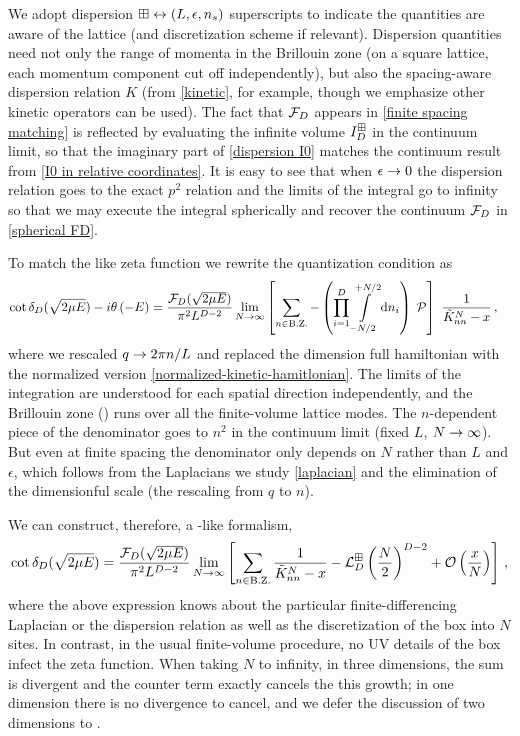 We adopt dispersion $\boxplus \leftrightarrow (L, \epsilon, {n_s})$ superscripts to indicate the quantities are aware of the lattice (and discretization scheme if relevant).
Dispersion quantities need not only the range of momenta in the Brillouin zone (on a square lattice, each momentum component cut off independently), but also the spacing-aware dispersion relation $K$ (from \eqref{kinetic}, for example, though we emphasize other kinetic operators can be used).
The fact that $\mathcal{F}_D$ appears in \eqref{finite spacing matching} is reflected by evaluating the infinite volume $I_D^{\boxplus}$ in the continuum limit, so that the imaginary part of \eqref{dispersion I0} matches the continuum result from \eqref{I0 in relative coordinates}.
It is easy to see that when $\epsilon\rightarrow0$ the dispersion relation goes to the exact $p^2$ relation and the limits of the integral go to infinity so that we may execute the integral spherically and recover the continuum $\mathcal{F}_D$ in \eqref{spherical FD}.

To match the \Luscher like zeta function we rewrite the quantization condition as
\begin{align}\label{eq:dispersion-counter-integral}
    \cot \delta_D(\sqrt{2 \mu E})-i\theta\left(-E\right)
    &=
    \frac{\mathcal{F}_D(\sqrt{2 \mu E})}{\pi^2 L^{D-2}}
    \lim_{N\rightarrow\infty}
    \left[
    	\sum_{n\in\text{B.Z.}} -
		\left(\prod_{i=1}^D
    		\int\limits_{-N/2}^{+N/2}
    		\mathrm{d} n_i
    	\right)\; \mathcal{P}
	\right]\  \frac{1}{\tilde K_{nn}^{N}-x}
	\, ,
\end{align}
where we rescaled $q\rightarrow 2\pi n/L$ and replaced the dimension full hamiltonian with the normalized version \eqref{normalized-kinetic-hamitlonian}.
The limits of the integration are understood for each spatial direction independently, and the Brillouin zone (\BZ) runs over all the finite-volume lattice modes.
The $n$-dependent piece of the denominator goes to $n^2$ in the continuum limit (fixed $L$, $N\rightarrow\infty$).
But even at finite spacing the denominator only depends on $N$ rather than $L$ and $\epsilon$, which follows from the Laplacians we study \eqref{laplacian} and the elimination of the dimensionful scale (the rescaling from $q$ to $n$).

We can construct, therefore, a \Luscher-like formalism,
\begin{align}
    \label{eq:dispersion quantization}
    \cot \delta_D( \sqrt{2 \mu E} )
    =
	\frac{\mathcal{F}_D(\sqrt{2 \mu E})}{\pi^2 L^{D-2}}
	\lim_{N\rightarrow\infty}
    \left[
    	\sum_{n\in\text{B.Z.}}\frac{1}{ \tilde K_{nn}^{N} - x} - \mathcal{L}_D^{\boxplus}\left(\frac{N}{2}\right)^{D-2}
		+ \mathcal O\left(\frac{x}{N}\right)
	\right]\, ,
\end{align}
where the above expression knows about the particular finite-differencing Laplacian or the dispersion relation as well as the discretization of the box into $N$ sites.
In contrast, in the usual finite-volume procedure, no UV details of the box infect the zeta function.
When taking $N$ to infinity, in three dimensions, the sum is divergent and the counter term exactly cancels the this growth; in one dimension there is no divergence to cancel, and we defer the discussion of two dimensions to .

